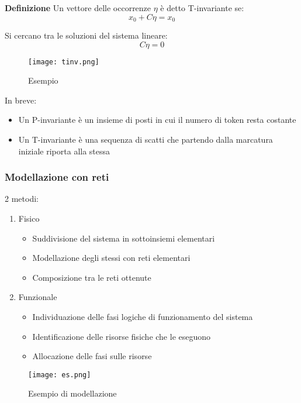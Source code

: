 \documentclass{article}
\begin{document}
\newpage

\noindent\textbf{Definizione} Un vettore delle occorrenze $\eta$ è detto T-invariante se:
$$x_0+C\eta=x_0$$

\noindent Si cercano tra le soluzioni del sistema lineare:
$$C\eta=0$$

\begin{figure}[ht]
    \centering
    \texttt{[image: tinv.png]}
    \caption{Esempio}
\end{figure}

\noindent In breve:
\begin{itemize}
    \item Un P-invariante è un insieme di posti in cui il numero di token resta costante
    \item Un T-invariante è una sequenza di scatti che partendo dalla marcatura iniziale riporta alla stessa\newline
\end{itemize}

\subsubsection{Modellazione con reti}

2 metodi:
\begin{enumerate}
    \item Fisico
        \begin{itemize}
            \item Suddivisione del sistema in sottoinsiemi elementari
            \item Modellazione degli stessi con reti elementari
            \item Composizione tra le reti ottenute
        \end{itemize}
    \item Funzionale
        \begin{itemize}
            \item Individuazione delle fasi logiche di funzionamento del sistema
            \item Identificazione delle risorse fisiche che le eseguono
            \item Allocazione delle fasi sulle risorse\newline
        \end{itemize}
\end{enumerate}

\begin{figure}[ht]
    \centering
    \texttt{[image: es.png]}
    \caption{Esempio di modellazione}
\end{figure}
\end{document}
